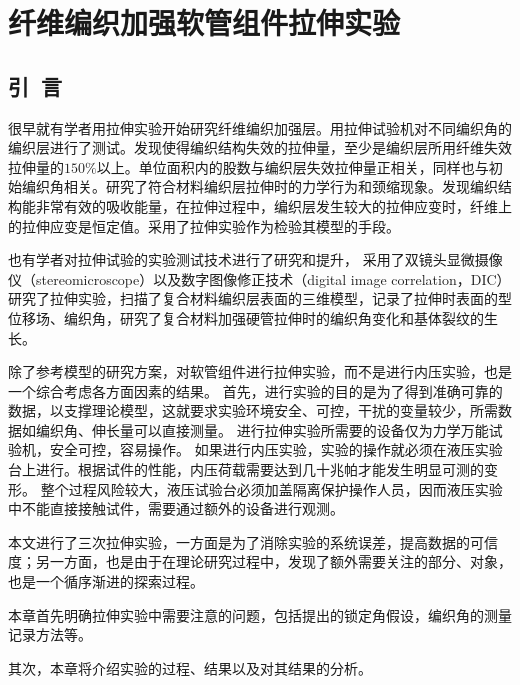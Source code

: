 
\chapter{纤维编织加强软管组件拉伸实验}
\section{引~言}

很早就有学者用拉伸实验开始研究纤维编织加强层。\citeauthor{brunnschweiler19545}\cite{brunnschweiler19545}用拉伸试验机对不同编织角的编织层进行了测试。发现使得编织结构失效的拉伸量，至少是编织层所用纤维失效拉伸量的$ 150\% $以上。单位面积内的股数与编织层失效拉伸量正相关，同样也与初始编织角相关。\citeauthor{Harte20001259}\cite{Harte20001259,Harte2000259}研究了符合材料编织层拉伸时的力学行为和颈缩现象。发现编织结构能非常有效的吸收能量，在拉伸过程中，编织层发生较大的拉伸应变时，纤维上的拉伸应变是恒定值。\citeauthor{Hachemi2011}\cite{Hachemi2011}采用了拉伸实验作为检验其模型的手段。


也有学者对拉伸试验的实验测试技术进行了研究和提升，\citeauthor{Leung2013}\cite{Leung2013}
采用了双镜头显微摄像仪（stereomicroscope）以及数字图像修正技术（digital image correlation，DIC）研究了拉伸实验，扫描了复合材料编织层表面的三维模型，记录了拉伸时表面的型位移场、编织角，研究了复合材料加强硬管拉伸时的编织角变化和基体裂纹的生长。


除了参考\hacite 模型的研究方案，对软管组件进行拉伸实验，而不是进行内压实验，也是一个综合考虑各方面因素的结果。
首先，进行实验的目的是为了得到准确可靠的数据，以支撑理论模型，这就要求实验环境安全、可控，干扰的变量较少，所需数据如编织角、伸长量可以直接测量。
进行拉伸实验所需要的设备仅为力学万能试验机，安全可控，容易操作。
如果进行内压实验，实验的操作就必须在液压实验台上进行。根据试件的性能，内压荷载需要达到几十兆帕才能发生明显可测的变形。
整个过程风险较大，液压试验台必须加盖隔离保护操作人员，因而液压实验中不能直接接触试件，需要通过额外的设备进行观测。

本文进行了三次拉伸实验，一方面是为了消除实验的系统误差，提高数据的可信度；另一方面，也是由于在理论研究过程中，发现了额外需要关注的部分、对象，也是一个循序渐进的探索过程。

本章首先明确拉伸实验中需要注意的问题，包括\ha 提出的锁定角假设，编织角的测量记录方法等。

其次，本章将介绍实验的过程、结果以及对其结果的分析。

